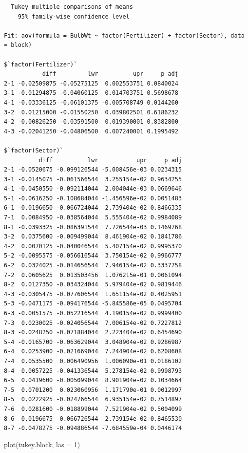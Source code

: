\documentclass[
  letterpaper,
  DIV=11,
  numbers=noendperiod]{scrreprt}
\newenvironment{Shaded}{\begin{snugshade}}{\end{snugshade}}
\newcommand{\AttributeTok}[1]{\textcolor[rgb]{0.40,0.45,0.13}{#1}}
\newcommand{\DecValTok}[1]{\textcolor[rgb]{0.68,0.00,0.00}{#1}}
\newcommand{\FunctionTok}[1]{\textcolor[rgb]{0.28,0.35,0.67}{#1}}
\newcommand{\NormalTok}[1]{\textcolor[rgb]{0.00,0.23,0.31}{#1}}
\begin{document}
\begin{verbatim}
  Tukey multiple comparisons of means
    95% family-wise confidence level

Fit: aov(formula = BulbWt ~ factor(Fertilizer) + factor(Sector), data = block)

$`factor(Fertilizer)`
           diff         lwr          upr     p adj
2-1 -0.02509875 -0.05275125  0.002553751 0.0840024
3-1 -0.01294875 -0.04060125  0.014703751 0.5698678
4-1 -0.03336125 -0.06101375 -0.005708749 0.0144260
3-2  0.01215000 -0.01550250  0.039802501 0.6186232
4-2 -0.00826250 -0.03591500  0.019390001 0.8382800
4-3 -0.02041250 -0.04806500  0.007240001 0.1995492

$`factor(Sector)`
          diff          lwr           upr     p adj
2-1 -0.0520675 -0.099126544 -5.008456e-03 0.0234315
3-1 -0.0145075 -0.061566544  3.255154e-02 0.9634255
4-1 -0.0450550 -0.092114044  2.004044e-03 0.0669646
5-1 -0.0616250 -0.108684044 -1.456596e-02 0.0051483
6-1 -0.0196650 -0.066724044  2.739404e-02 0.8466335
7-1  0.0084950 -0.038564044  5.555404e-02 0.9984089
8-1 -0.0393325 -0.086391544  7.726544e-03 0.1469768
3-2  0.0375600 -0.009499044  8.461904e-02 0.1841786
4-2  0.0070125 -0.040046544  5.407154e-02 0.9995370
5-2 -0.0095575 -0.056616544  3.750154e-02 0.9966777
6-2  0.0324025 -0.014656544  7.946154e-02 0.3337758
7-2  0.0605625  0.013503456  1.076215e-01 0.0061094
8-2  0.0127350 -0.034324044  5.979404e-02 0.9819446
4-3 -0.0305475 -0.077606544  1.651154e-02 0.4025951
5-3 -0.0471175 -0.094176544 -5.845586e-05 0.0495704
6-3 -0.0051575 -0.052216544  4.190154e-02 0.9999400
7-3  0.0230025 -0.024056544  7.006154e-02 0.7227812
8-3 -0.0248250 -0.071884044  2.223404e-02 0.6454690
5-4 -0.0165700 -0.063629044  3.048904e-02 0.9286987
6-4  0.0253900 -0.021669044  7.244904e-02 0.6208608
7-4  0.0535500  0.006490956  1.006090e-01 0.0186102
8-4  0.0057225 -0.041336544  5.278154e-02 0.9998793
6-5  0.0419600 -0.005099044  8.901904e-02 0.1034664
7-5  0.0701200  0.023060956  1.171790e-01 0.0012997
8-5  0.0222925 -0.024766544  6.935154e-02 0.7514897
7-6  0.0281600 -0.018899044  7.521904e-02 0.5004099
8-6 -0.0196675 -0.066726544  2.739154e-02 0.8465530
8-7 -0.0478275 -0.094886544 -7.684559e-04 0.0446174
\end{verbatim}

\begin{Shaded}
\begin{Highlighting}[]
\FunctionTok{plot}\NormalTok{(tukey.block, }\AttributeTok{las =} \DecValTok{1}\NormalTok{)}
\end{Highlighting}
\end{Shaded}
\end{document}
